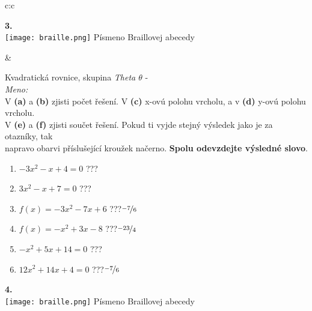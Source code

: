 \documentclass[10pt]{report}
\begin{document}
\begin{tabular}{c:c}
\begin{minipage}[c][99mm][t]{0.49\linewidth}
\begin{center}
\begin{minipage}{0.20\linewidth}
\begin{center}
{\Huge\bfseries 3.} \\[2mm]
\texttt{[image: braille.png]}
{\small Písmeno Braillovej abecedy}
\end{center}
\end{minipage}
\end{center}
\end{minipage}
&
\begin{minipage}[c][99mm][t]{0.49\linewidth}
\begin{center}
\vspace{7mm}
{\huge Kvadratická rovnice, skupina \textit{Theta $\theta$} -}\\[4.5mm]
\textit{Meno:}\phantom{xxxxxxxxxxxxxxxxxxxxxxxxxxxxxxxxxxxxxxxxxxxxxxxxxxxxxxxxxxxxxxxxx}\\[3.5mm]
V \textbf{(a)} a \textbf{(b)} zjisti počet řešení. V \textbf{(c)} x-ovú polohu vrcholu, a v \textbf{(d)} y-ovú polohu vrcholu.\\V \textbf{(e)} a \textbf{(f)} zjisti součet řešení. Pokud ti vyjde stejný výsledek jako je za otazníky, tak\\napravo obarvi příslušející kroužek načerno. \textbf{Spolu odevzdejte výsledné slovo}.\\[3mm]
\begin{minipage}{0.77\linewidth}
\begin{center}
\begin{varwidth}{\textwidth}
\begin{enumerate}
\large
\item $-3x^2-x+4=0$\quad \dotfill\; ???\;\dotfill {}
\item $3x^2-x+7=0$\quad \dotfill\; ???\;\dotfill {}
\item $f(x)=-3x^2-7x+6$\quad \dotfill\; ???\;\dotfill \quad $\nicefrac{-7}{6}$
\item $f(x)=-x^2+3x-8$\quad \dotfill\; ???\;\dotfill \quad $\nicefrac{-23}{4}$
\item $-x^2+5x+14=0$\quad \dotfill\; ???\;\dotfill {}
\item $12x^2+14x+4=0$\quad \dotfill\; ???\;\dotfill \quad $\nicefrac{-7}{6}$
\end{enumerate}
\end{varwidth}
\end{center}
\end{minipage}
\begin{minipage}{0.20\linewidth}
\begin{center}
{\Huge\bfseries 4.} \\[2mm]
\texttt{[image: braille.png]}
{\small Písmeno Braillovej abecedy}
\end{center}
\end{minipage}
\end{center}
\end{minipage}

\end{tabular}
\end{document}

